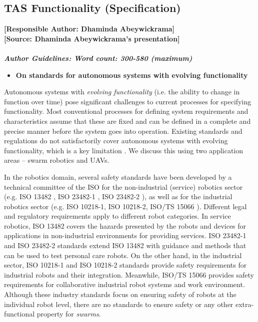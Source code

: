 \documentclass[sigconf]{acmart}
\begin{document}
\subsection{TAS Functionality (Specification)}
\noindent\textbf{[Responsible Author:  Dhaminda Abeywickrama]}\\
\noindent\textbf{[Source: Dhaminda Abeywickrama's presentation]}\\\\
\noindent\textbf{\textit{Author Guidelines: Word count: 300-580 (maximum)}}\\
\begin{itemize}
	\item \textbf{On standards for autonomous systems with evolving functionality}
\end{itemize}

Autonomous systems with \textit{evolving functionality} (i.e. the ability to change in function over time) pose significant challenges to current processes for specifying functionality. 
Most conventional processes for defining system requirements and characteristics assume that these are fixed and can be defined in a complete and precise manner before the system goes into operation. 
Existing standards and regulations do not satisfactorily cover autonomous systems with evolving functionality, which is a key limitation \cite{Fisher2020}. We discuss this using two application areas -- swarm robotics and UAVs.

In the robotics domain, several safety standards have been developed by a technical committee of the ISO for the non-industrial (service) robotics sector (e.g. ISO 13482 \cite{ISO13482}, ISO 23482-1 \cite{ISO23482-1}, ISO 23482-2  \cite{ISO23482-2}), as well as for the industrial robotics sector (e.g. ISO 10218-1\cite{ISO10218-1}, ISO 10218-2\cite{ISO10218-2}, ISO/TS 15066 \cite{ISO15066}). 
Different legal and regulatory requirements apply to different robot categories. 
In service robotics, ISO 13482 covers the hazards presented by the robots and devices for applications in non-industrial environments for providing services. 
ISO 23482-1 and ISO 23482-2 standards extend ISO 13482 with guidance and methods that can be used to test personal care robots.
On the other hand, in the industrial sector, ISO 10218-1 and ISO 10218-2 standards provide safety requirements for industrial robots and their integration.
Meanwhile, ISO/TS 15066 provides safety requirements for collaborative industrial robot systems
and work environment. 
Although these industry standards focus on ensuring safety of robots at the individual robot level, there are no standards to ensure safety or any other extra-functional property for \textit{swarms}.
\end{document}
